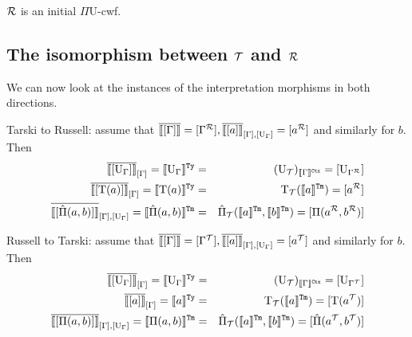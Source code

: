 \documentclass{lmcs}
\def\UU{\mathrm{U}}
\def\Ta{\mathrm{T}}
\def\Pihat{\hat{\Pi}}
\newcommand{\intCtxU}[1]{\llbracket #1 \rrbracket^\RawCtx}
\newcommand{\intTyU}[1]{\llbracket #1 \rrbracket^\RawTy}
\newcommand{\intTmU}[1]{\llbracket #1 \rrbracket^\RawTm}
\begin{document}
\begin{thm}\label{theom:initial_cwf}
  $\mathcal{R}$ is an initial $\Pi\UU$-cwf.
\end{thm}

\subsection{The isomorphism between ${\mathcal T}$ and $\mathcal{R}$}
We can now look at the instances of the interpretation morphisms in both directions.

Tarski to Russell: assume that $\iniCtx{[\Gamma]} = [ \Gamma^\R ], \iniTm{[\Gamma]}{[\UU_\Gamma]}{[a]} = [ a^\R ]$ and similarly for $b$. Then
\begin{eqnarray*}
\iniTy{[\Gamma]}{[\UU_\Gamma]} =
 \intTyU{\UU_\Gamma} &=& (\UU_\T)_{\intCtxU{\Gamma}}
 = [\UU_{\Gamma^\R}]
 \\
\iniTy{[\Gamma]}{[\Ta(a)]}= \intTyU{\Ta(a)} &=& \Ta_\T(\intTmU{a}) 
= [a^\R]\\
\iniTm{[\Gamma]}{[\UU_\Gamma]}{[\Pihat(a,b)]} = \intTmU{\Pihat(a,b)}&=& \Pihat_\T(\intTmU{a},\intTmU{b})
= [\Pi(a^\R,b^\R)]
\end{eqnarray*}

Russell to Tarski: assume that $\iniCtx{[\Gamma]} = [ \Gamma^\T ], \iniTm{[\Gamma]}{[\UU_\Gamma]}{[a]} = [ a^\T ]$ and similarly for $b$. Then
\begin{eqnarray*}
\iniTy{[\Gamma]}{[\UU_\Gamma]} =
 \intTyU{\UU_\Gamma} &=& (\UU_\T)_{\intCtxU{\Gamma}}
 = [\UU_{\Gamma^\T}]
 \\
\iniTy{[\Gamma]}{[a]}= \intTyU{a} &=& \Ta_\T(\intTmU{a}) 
= [\Ta(a^\T)]\\
\iniTm{[\Gamma]}{[\UU_\Gamma]}{[\Pi(a,b)]} = \intTmU{\Pi(a,b)}&=& \hat{\Pi}_\T(\intTmU{a},\intTmU{b})
= [\Pihat(a^\T,b^\T)]
\end{eqnarray*}



\end{document}

